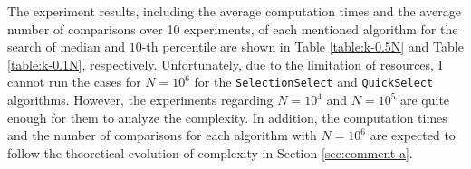 \documentclass[acmconf,nonacm=true]{acmart}
\begin{document}

The experiment results, including the average computation times and the average number of comparisons over 10 experiments, of each mentioned algorithm for the search of median and $10$-th percentile are shown in Table \ref{table:k-0.5N} and Table \ref{table:k-0.1N}, respectively. Unfortunately, due to the limitation of resources, I cannot run the cases for $N=10^6$ for the \texttt{SelectionSelect} and \texttt{QuickSelect} algorithms. However, the experiments regarding $N=10^4$ and $N=10^5$ are quite enough for them to analyze the complexity. In addition, the computation times and the number of comparisons for each algorithm with $N=10^6$ are expected to follow the theoretical evolution of complexity in Section \ref{sec:comment-a}.
\end{document}
